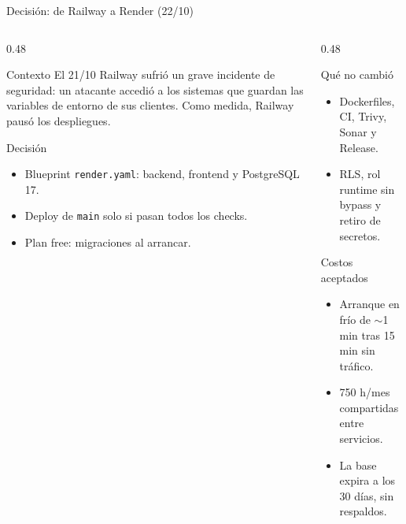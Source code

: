 
\begin{frame}{Decisión: de Railway a Render (22/10)}
\begin{columns}[T,onlytextwidth]
\begin{column}{0.48\textwidth}
\begin{block}{Contexto}
\small El 21/10 Railway sufrió un grave incidente de seguridad: un atacante accedió a los sistemas que guardan las variables de entorno de sus clientes. Como medida, Railway pausó los despliegues.
\end{block}
\begin{block}{Decisión}
\small
\begin{itemize}
  \item Blueprint \texttt{render.yaml}: backend, frontend y PostgreSQL 17.
  \item Deploy de \texttt{main} solo si pasan todos los checks.
  \item Plan free: migraciones al arrancar.
\end{itemize}
\end{block}
\end{column}
\begin{column}{0.48\textwidth}
\begin{block}{Qué no cambió}
\small
\begin{itemize}
  \item Dockerfiles, CI, Trivy, Sonar y Release.
  \item RLS, rol runtime sin bypass y retiro de secretos.
\end{itemize}
\end{block}
\begin{block}{Costos aceptados}
\small
\begin{itemize}
  \item Arranque en frío de $\sim$1 min tras 15 min sin tráfico.
  \item 750 h/mes compartidas entre servicios.
  \item La base expira a los 30 días, sin respaldos.
\end{itemize}
\end{block}
\end{column}
\end{columns}
\end{frame}
